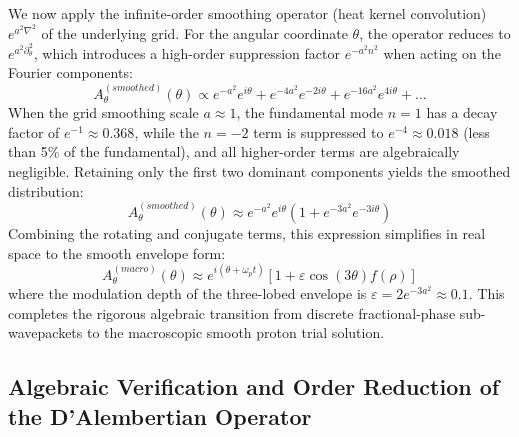 \documentclass[12pt, a4paper]{article}
\begin{document}
We now apply the infinite-order smoothing operator (heat kernel convolution) $e^{a^2 \nabla^2}$ of the underlying grid. For the angular coordinate $\theta$, the operator reduces to $e^{a^2 \partial_\theta^2}$, which introduces a high-order suppression factor $e^{-a^2 n^2}$ when acting on the Fourier components:
\begin{equation}
A_\theta^{(smoothed)}(\theta) \propto e^{-a^2} e^{i\theta} + e^{-4a^2} e^{-2i\theta} + e^{-16a^2} e^{4i\theta} + \dots \label{eq:smoothed_angular}
\end{equation}
When the grid smoothing scale $a \approx 1$, the fundamental mode $n=1$ has a decay factor of $e^{-1} \approx 0.368$, while the $n=-2$ term is suppressed to $e^{-4} \approx 0.018$ (less than 5\% of the fundamental), and all higher-order terms are algebraically negligible. Retaining only the first two dominant components yields the smoothed distribution:
\begin{equation}
A_\theta^{(smoothed)}(\theta) \approx e^{-a^2} e^{i\theta} \left( 1 + e^{-3a^2} e^{-3i\theta} \right) \label{eq:approx_smoothed}
\end{equation}
Combining the rotating and conjugate terms, this expression simplifies in real space to the smooth envelope form:
\begin{equation}
A_\theta^{(macro)}(\theta) \approx e^{i(\theta + \omega_p t)} \left[ 1 + \varepsilon \cos(3\theta) f(\rho) \right] \label{eq:macro_final}
\end{equation}
where the modulation depth of the three-lobed envelope is $\varepsilon = 2e^{-3a^2} \approx 0.1$. This completes the rigorous algebraic transition from discrete fractional-phase sub-wavepackets to the macroscopic smooth proton trial solution.

\subsection{Algebraic Verification and Order Reduction of the D'Alembertian Operator}
\end{document}
